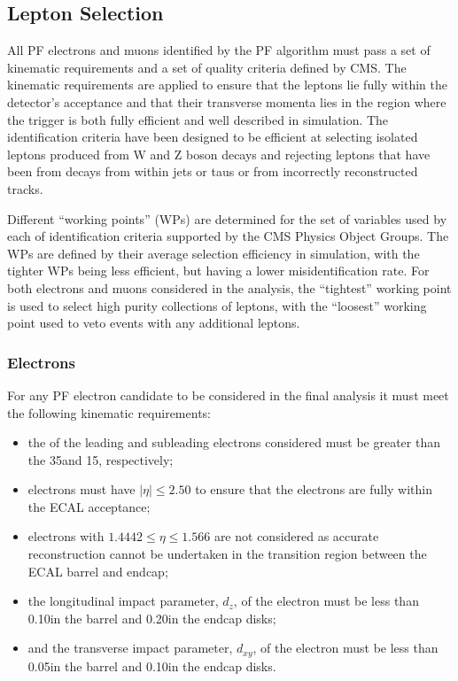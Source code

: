 \subsection{Lepton Selection}
All PF electrons and muons identified by the PF algorithm must pass a set of kinematic requirements and a set of quality criteria defined by CMS.
The kinematic requirements are applied to ensure that the leptons lie fully within the detector's acceptance and that their transverse momenta lies in the region where the trigger is both fully efficient and well described in simulation.
The identification criteria have been designed to be efficient at selecting isolated leptons produced from W and Z boson decays and rejecting leptons that have been from decays from within jets or taus or from incorrectly reconstructed tracks.

Different ``working points'' (WPs) are determined for the set of variables used by each of identification criteria supported by the CMS Physics Object Groups.
The WPs are defined by their average selection efficiency in simulation, with the tighter WPs being less efficient, but having a lower misidentification rate.
For both electrons and muons  considered in the analysis, the ``tightest'' working point is used to select high purity collections of leptons, with the ``loosest'' working point used to veto events with any additional leptons.

\subsubsection{Electrons}\label{subsubsec:electronSelection}
For any PF electron candidate to be considered in the final analysis it must meet the following kinematic requirements:

\begin{itemize}
\item the \pt of the leading and subleading electrons considered must be greater than the 35\GeVc and 15\GeVc, respectively;
\item electrons must have $|\eta| \leq 2.50$ to ensure that the electrons are fully within the ECAL acceptance;
\item electrons with $1.4442 \leq \eta \leq 1.566$ are not considered as  accurate reconstruction cannot be undertaken in the transition region between the ECAL barrel and endcap;
\item the longitudinal impact parameter, $d_{z}$, of the electron must be less than 0.10\cm in the barrel and 0.20\cm in the endcap disks;
\item and the transverse impact parameter, $d_{xy}$, of the electron must be less than 0.05\cm in the barrel and 0.10\cm in the endcap disks.
\end{itemize}

